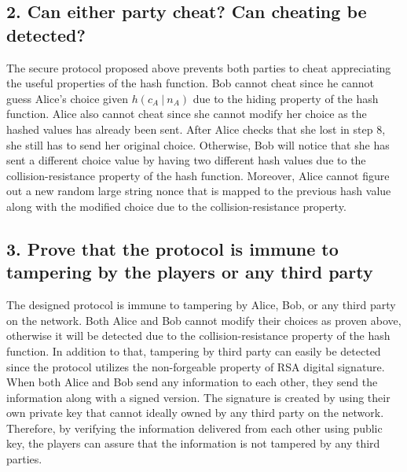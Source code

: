 \documentclass[runningheads]{llncs}
\begin{document}
\subsection*{2. Can either party cheat? Can cheating be detected?}
The secure protocol proposed above prevents both parties to cheat appreciating the useful properties of the hash function.
Bob cannot cheat since he cannot guess Alice's choice given $h(c_A\ |\ n_A)$ due to the hiding property of the hash function.
Alice also cannot cheat since she cannot modify her choice as the hashed values has already been sent.
After Alice checks that she lost in step 8, she still has to send her original choice.
Otherwise, Bob will notice that she has sent a different choice value by having two different hash values due to the collision-resistance property of the hash function.
Moreover, Alice cannot figure out a new random large string nonce that is mapped to the previous hash value along with the modified choice due to the collision-resistance property.

\subsection*{3. Prove that the protocol is immune to tampering by the players or any third party}
The designed protocol is immune to tampering by Alice, Bob, or any third party on the network.
Both Alice and Bob cannot modify their choices as proven above, otherwise it will be detected due to the collision-resistance property of the hash function.
In addition to that, tampering by third party can easily be detected since the protocol utilizes the non-forgeable property of RSA digital signature.
When both Alice and Bob send any information to each other, they send the information along with a signed version.
The signature is created by using their own private key that cannot ideally owned by any third party on the network.
Therefore, by verifying the information delivered from each other using public key, the players can assure that the information is not tampered by any third parties.
\end{document}
